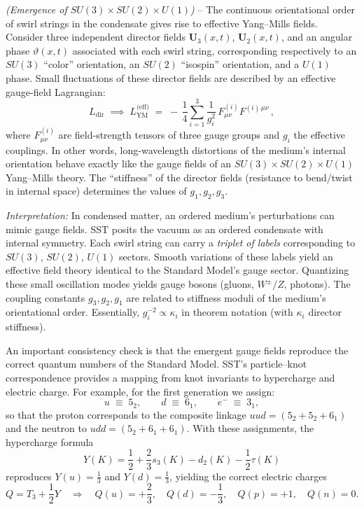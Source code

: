 \documentclass[reprint,aps,onecolumn,nofootinbib]{revtex4-2}
\begin{document}
	\begin{tcolorbox}[title=Theorem 6.1: Emergent Yang–Mills Fields]
		\emph{(Emergence of $SU(3)\times SU(2)\times U(1)$)} – The continuous orientational order of swirl strings in the condensate gives rise to effective Yang–Mills fields. Consider three independent director fields $\mathbf{U}_3(x,t)$, $\mathbf{U}_2(x,t)$, and an angular phase $\vartheta(x,t)$ associated with each swirl string, corresponding respectively to an $SU(3)$ “color” orientation, an $SU(2)$ “isospin” orientation, and a $U(1)$ phase. Small fluctuations of these director fields are described by an effective gauge-field Lagrangian:
		\[
			L_{\text{dir}} \;\implies\; L_{\text{YM}}^{\text{(eff)}} \;=\; -\,\frac{1}{4}\sum_{i=1}^3 \frac{1}{g_i^2}\,F^{(i)}_{\mu\nu} F^{(i)\,\mu\nu}\,,
		\]
		where $F_{\mu\nu}^{(i)}$ are field-strength tensors of three gauge groups and $g_i$ the effective couplings. In other words, long-wavelength distortions of the medium’s internal orientation behave exactly like the gauge fields of an $SU(3)\times SU(2)\times U(1)$ Yang–Mills theory. The “stiffness” of the director fields (resistance to bend/twist in internal space) determines the values of $g_1, g_2, g_3$.
	\end{tcolorbox}

	\noindent \textit{Interpretation:} In condensed matter, an ordered medium’s perturbations can mimic gauge fields. SST posits the vacuum as an ordered condensate with internal symmetry. Each swirl string can carry a \emph{triplet of labels} corresponding to $SU(3)$, $SU(2)$, $U(1)$ sectors. Smooth variations of these labels yield an effective field theory identical to the Standard Model’s gauge sector. Quantizing these small oscillation modes yields gauge bosons (gluons, $W^\pm/Z$, photons). The coupling constants $g_{3}, g_{2}, g_{1}$ are related to stiffness moduli of the medium’s orientational order. Essentially, $g_i^{-2} \propto \kappa_i$ in theorem notation (with $\kappa_i$ director stiffness).

        \noindent
        An important consistency check is that the emergent gauge fields reproduce the correct quantum numbers of the Standard Model.
        SST’s particle–knot correspondence provides a mapping from knot invariants to hypercharge and electric charge.
        For example, for the first generation we assign:
        \[
            u \;\equiv\; 5_2, \qquad d \;\equiv\; 6_1, \qquad e^- \;\equiv\; 3_1,
        \]
        so that the proton corresponds to the composite linkage $uud = (5_2 + 5_2 + 6_1)$ and the neutron to $udd = (5_2 + 6_1 + 6_1)$.
        With these assignments, the hypercharge formula
        \[
            Y(K) = \frac{1}{2} + \frac{2}{3}s_3(K) - d_2(K) - \frac{1}{2}\tau(K)
        \]
        reproduces $Y(u) = \tfrac{1}{3}$ and $Y(d) = \tfrac{1}{3}$, yielding the correct electric charges
        \[
            Q = T_3 + \frac{1}{2}Y \quad \Rightarrow \quad
            Q(u) = +\frac{2}{3}, \quad Q(d) = -\frac{1}{3}, \quad Q(p)=+1, \quad Q(n)=0.
        \]
\end{document}
